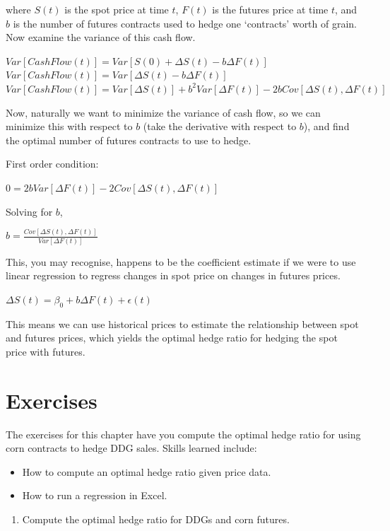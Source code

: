 \documentclass[
  letterpaper,
  DIV=11,
  numbers=noendperiod]{scrreprt}
\providecommand{\tightlist}{%
  \setlength{\itemsep}{0pt}\setlength{\parskip}{0pt}}\usepackage{longtable,booktabs,array}
\begin{document}
where \(S(t)\) is the spot price at time \(t\), \(F(t)\) is the futures
price at time \(t\), and \(b\) is the number of futures contracts used
to hedge one `contracts' worth of grain. Now examine the variance of
this cash flow.

\(Var[CashFlow(t)] = Var[S(0) + \Delta S(t) - b\Delta F(t)]\)\\
\(Var[CashFlow(t)] = Var[\Delta S(t) - b\Delta F(t)]\)\\
\(Var[CashFlow(t)] = Var[\Delta S(t)] + b^2Var[\Delta F(t)] - 2bCov[\Delta S(t),\Delta F(t)]\)

Now, naturally we want to minimize the variance of cash flow, so we can
minimize this with respect to \(b\) (take the derivative with respect to
\(b\)), and find the optimal number of futures contracts to use to
hedge.

First order condition:

\(0 = 2bVar[\Delta F(t)] - 2Cov[\Delta S(t),\Delta F(t)]\)

Solving for \(b\),

\(b = \frac{Cov[\Delta S(t),\Delta F(t)]}{Var[\Delta F(t)]}\)

This, you may recognise, happens to be the coefficient estimate if we
were to use linear regression to regress changes in spot price on
changes in futures prices.

\(\Delta S(t) = \beta_0 + b\Delta F(t) + \epsilon(t)\)

This means we can use historical prices to estimate the relationship
between spot and futures prices, which yields the optimal hedge ratio
for hedging the spot price with futures.

\hypertarget{exercises-6}{%
\section{Exercises}\label{exercises-6}}

The exercises for this chapter have you compute the optimal hedge ratio
for using corn contracts to hedge DDG sales. Skills learned include:

\begin{itemize}
\item
  How to compute an optimal hedge ratio given price data.
\item
  How to run a regression in Excel.
\end{itemize}

\begin{enumerate}
\def\labelenumi{\arabic{enumi}.}
\tightlist
\item
  Compute the optimal hedge ratio for DDGs and corn futures.
\end{enumerate}
\end{document}
